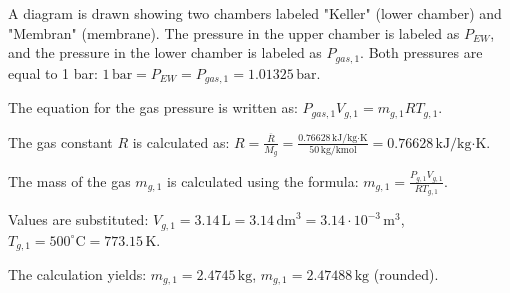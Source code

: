 A diagram is drawn showing two chambers labeled "Keller" (lower chamber) and "Membran" (membrane). The pressure in the upper chamber is labeled as \( P_{EW} \), and the pressure in the lower chamber is labeled as \( P_{gas,1} \). Both pressures are equal to 1 bar:  
\( 1 \, \text{bar} = P_{EW} = P_{gas,1} = 1.01325 \, \text{bar} \).  

The equation for the gas pressure is written as:  
\( P_{gas,1} V_{g,1} = m_{g,1} R T_{g,1} \).  

The gas constant \( R \) is calculated as:  
\( R = \frac{\overline{R}}{M_g} = \frac{0.76628 \, \text{kJ/kg·K}}{50 \, \text{kg/kmol}} = 0.76628 \, \text{kJ/kg·K} \).  

The mass of the gas \( m_{g,1} \) is calculated using the formula:  
\( m_{g,1} = \frac{P_{g,1} V_{g,1}}{R T_{g,1}} \).  

Values are substituted:  
\( V_{g,1} = 3.14 \, \text{L} = 3.14 \, \text{dm}^3 = 3.14 \cdot 10^{-3} \, \text{m}^3 \),  
\( T_{g,1} = 500^\circ \text{C} = 773.15 \, \text{K} \).  

The calculation yields:  
\( m_{g,1} = 2.4745 \, \text{kg} \),  
\( m_{g,1} = 2.47488 \, \text{kg} \) (rounded).